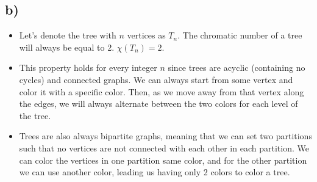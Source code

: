 \documentclass[12pt]{article}
\begin{document}
\subsection*{b)}
\begin{itemize}
	\item Let's denote the tree with $n$ vertices as $T_n$. The chromatic number of a tree will always be equal to 2. $\chi(T_n) = 2$.
	\item This property holds for every integer $n$ since trees are acyclic (containing no cycles) and connected graphs. We can always start from some vertex and color it with a specific color. Then, as we move away from that vertex along the edges, we will always alternate between the two colors for each level of the tree.
	\item Trees are also always bipartite graphs, meaning that we can set two partitions such that no vertices are not connected with each other in each partition. We can color the vertices in one partition same color, and for the other partition we can use another color, leading us having only 2 colors to color a tree.
\end{itemize}
\end{document}
